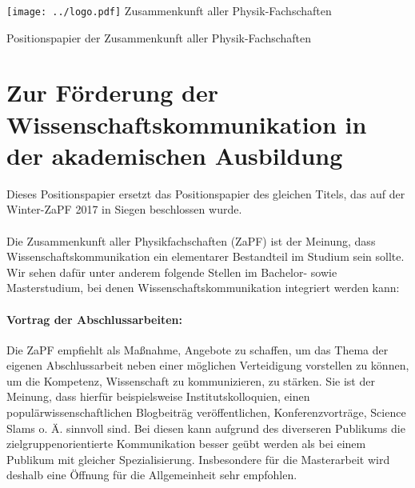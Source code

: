 \documentclass[DIV=calc]{scrartcl}
\begin{document}
    \hspace{0.87\textwidth}
    \begin{minipage}{120pt}
        \vspace{-1.8cm}
        \texttt{[image: ../logo.pdf]}
        \centering
        \small Zusammenkunft aller Physik-Fachschaften
    \end{minipage}
    \begin{center}
        \huge{Positionspapier der Zusammenkunft aller Physik-Fachschaften}\vspace{.25\baselineskip}\\
        \normalsize
    \end{center}
    \vspace{1cm}

\section*{Zur Förderung der Wissenschaftskommunikation in der akademischen Ausbildung}


Dieses Positionspapier ersetzt das Positionspapier des gleichen Titels, das auf der Winter-ZaPF 2017 in Siegen beschlossen wurde.\\~\\
Die Zusammenkunft aller Physikfachschaften (ZaPF) ist der Meinung, dass Wissenschaftskommunikation ein elementarer Bestandteil im Studium sein sollte. Wir sehen dafür unter anderem folgende Stellen im Bachelor- sowie Masterstudium, bei denen Wissenschaftskommunikation integriert werden kann:\\
\paragraph{Vortrag der Abschlussarbeiten:} Die ZaPF empfiehlt als Maßnahme, Angebote zu schaffen, um das Thema der eigenen Abschlussarbeit neben einer möglichen Verteidigung vorstellen zu können, um die Kompetenz, Wissenschaft zu kommunizieren, zu stärken. Sie ist der Meinung, dass hierfür beispielsweise Institutskolloquien, einen populärwissenschaftlichen Blogbeiträg veröffentlichen, Konferenzvorträge, Science Slams o. Ä. sinnvoll sind. Bei diesen kann aufgrund des diverseren Publikums die zielgruppenorientierte Kommunikation besser geübt werden als bei einem Publikum mit gleicher Spezialisierung. Insbesondere für die Masterarbeit wird deshalb eine Öffnung für die Allgemeinheit sehr empfohlen. 
\end{document}

